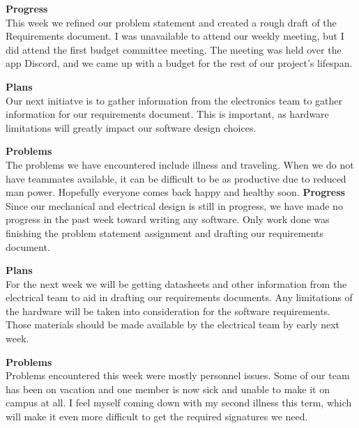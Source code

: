 \textbf{Progress} \\
This week we refined our problem statement and created a rough draft of the Requirements document. I was unavailable 
to attend our weekly meeting, but I did attend the first budget committee meeting. The meeting was held over the app 
Discord, and we came up with a budget for the rest of our project's lifespan.

\textbf{Plans} \\
Our next initiatve is to gather information from the electronics team to gather information for our requirements
document. This is important, as hardware limitations will greatly impact our software design choices.

\textbf{Problems} \\
The problems we have encountered include illness and traveling. When we do not have teammates available, it can be
difficult to be as productive due to reduced man power. Hopefully everyone comes back happy and healthy soon.
\textbf{Progress} \\
Since our mechanical and electrical design is still in progress, we have made no progress in the past week toward writing any software. Only work done was finishing the problem statement assignment and drafting our requirements document.

\textbf{Plans} \\
For the next week we will be getting datasheets and other information from the electrical team to aid in drafting our requirements documents. Any limitations of the hardware will be taken into consideration for the software requirements. Those materials should be made available by the electrical team by early next week.

\textbf{Problems} \\
Problems encountered this week were mostly personnel issues. Some of our team has been on vacation and one member is now sick and unable to make it on campus at all. I feel myself coming down with my second illness this term, which will make it even more difficult to get the required signatures we need.

